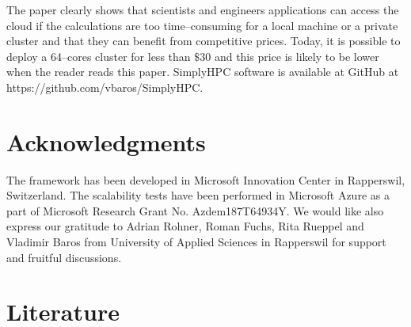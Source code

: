 \documentclass[3p,times]{elsarticle}
\begin{document}
The paper clearly shows that scientists and engineers applications can access the cloud if the calculations are too time--consuming for a local machine or a private cluster and that they can benefit from competitive prices. Today, it is possible to deploy a 64--cores cluster for less than $\$30$ and this price is likely to be lower when the reader reads this paper. SimplyHPC software is available at GitHub at https://github.com/vbaros/SimplyHPC.





\section{Acknowledgments}
\label{sec:ackn}

The framework has been developed in Microsoft Innovation Center in Rapperswil, Switzerland. The scalability tests have been performed in Microsoft Azure as a part of Microsoft Research Grant No. Azdem187T64934Y. We would like also express our gratitude to Adrian Rohner, Roman Fuchs, Rita Rueppel and Vladimir Baros from University of Applied Sciences in Rapperswil for support and fruitful discussions.

\section{Literature}
\label{sec:literature}



\end{document}
